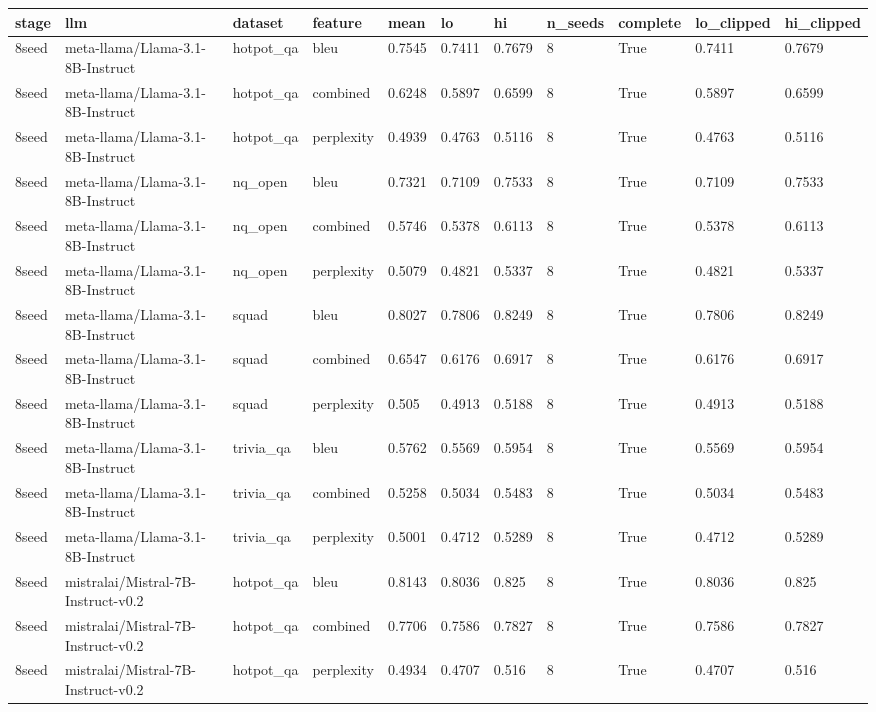 \begin{tabular}{lllllllllll}
\toprule
stage & llm & dataset & feature & mean & lo & hi & n\_seeds & complete & lo\_clipped & hi\_clipped \\
\midrule
8seed & meta-llama/Llama-3.1-8B-Instruct & hotpot\_qa & bleu & 0.7545 & 0.7411 & 0.7679 & 8 & True & 0.7411 & 0.7679 \\
8seed & meta-llama/Llama-3.1-8B-Instruct & hotpot\_qa & combined & 0.6248 & 0.5897 & 0.6599 & 8 & True & 0.5897 & 0.6599 \\
8seed & meta-llama/Llama-3.1-8B-Instruct & hotpot\_qa & perplexity & 0.4939 & 0.4763 & 0.5116 & 8 & True & 0.4763 & 0.5116 \\
8seed & meta-llama/Llama-3.1-8B-Instruct & nq\_open & bleu & 0.7321 & 0.7109 & 0.7533 & 8 & True & 0.7109 & 0.7533 \\
8seed & meta-llama/Llama-3.1-8B-Instruct & nq\_open & combined & 0.5746 & 0.5378 & 0.6113 & 8 & True & 0.5378 & 0.6113 \\
8seed & meta-llama/Llama-3.1-8B-Instruct & nq\_open & perplexity & 0.5079 & 0.4821 & 0.5337 & 8 & True & 0.4821 & 0.5337 \\
8seed & meta-llama/Llama-3.1-8B-Instruct & squad & bleu & 0.8027 & 0.7806 & 0.8249 & 8 & True & 0.7806 & 0.8249 \\
8seed & meta-llama/Llama-3.1-8B-Instruct & squad & combined & 0.6547 & 0.6176 & 0.6917 & 8 & True & 0.6176 & 0.6917 \\
8seed & meta-llama/Llama-3.1-8B-Instruct & squad & perplexity & 0.505 & 0.4913 & 0.5188 & 8 & True & 0.4913 & 0.5188 \\
8seed & meta-llama/Llama-3.1-8B-Instruct & trivia\_qa & bleu & 0.5762 & 0.5569 & 0.5954 & 8 & True & 0.5569 & 0.5954 \\
8seed & meta-llama/Llama-3.1-8B-Instruct & trivia\_qa & combined & 0.5258 & 0.5034 & 0.5483 & 8 & True & 0.5034 & 0.5483 \\
8seed & meta-llama/Llama-3.1-8B-Instruct & trivia\_qa & perplexity & 0.5001 & 0.4712 & 0.5289 & 8 & True & 0.4712 & 0.5289 \\
8seed & mistralai/Mistral-7B-Instruct-v0.2 & hotpot\_qa & bleu & 0.8143 & 0.8036 & 0.825 & 8 & True & 0.8036 & 0.825 \\
8seed & mistralai/Mistral-7B-Instruct-v0.2 & hotpot\_qa & combined & 0.7706 & 0.7586 & 0.7827 & 8 & True & 0.7586 & 0.7827 \\
8seed & mistralai/Mistral-7B-Instruct-v0.2 & hotpot\_qa & perplexity & 0.4934 & 0.4707 & 0.516 & 8 & True & 0.4707 & 0.516 \\

\end{tabular}
